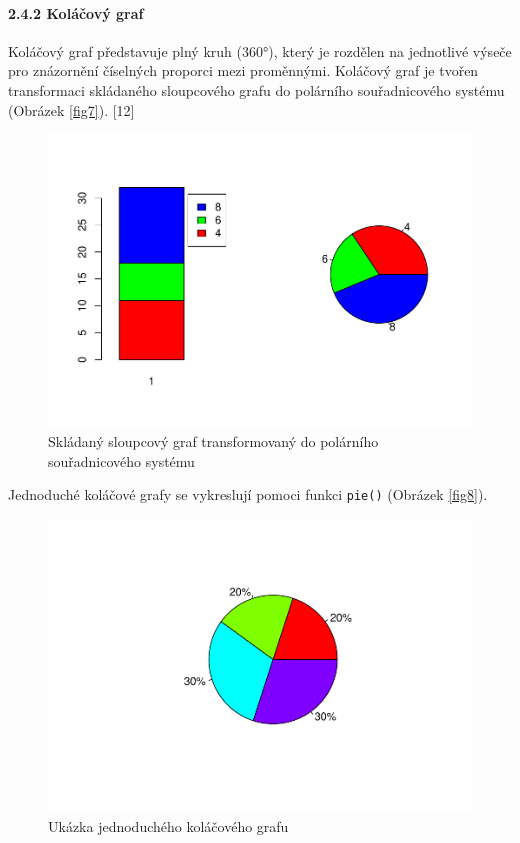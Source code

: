 \documentclass[12pt,]{article}
\let\oldparagraph\paragraph
\renewcommand{\paragraph}[1]{\oldparagraph{#1}\mbox{}}
\begin{document}
\paragraph{2.4.2 Koláčový graf}\label{kolacovy-graf}

\qquad Koláčový graf představuje plný kruh (360°), který je rozdělen na
jednotlivé výseče pro znázornění číselných proporci mezi proměnnými.
Koláčový graf je tvořen transformaci skládaného sloupcového grafu do
polárního souřadnicového systému (Obrázek \ref{fig7}). {[}12{]}

\begin{figure}[H]

{\centering \includegraphics[width=0.65\linewidth]{BP_files/figure-latex/barplot_to_pie-1} 

}

\caption{\label{fig7} Skládaný sloupcový graf transformovaný do polárního souřadnicového systému}\label{fig:barplot_to_pie}
\end{figure}

\qquad Jednoduché koláčové grafy se vykreslují pomoci funkci
\texttt{pie()} (Obrázek \ref{fig8}).

\begin{figure}[H]

{\centering \includegraphics[width=0.65\linewidth]{BP_files/figure-latex/pie_example-1} 

}

\caption{\label{fig8} Ukázka jednoduchého koláčového grafu}\label{fig:pie_example}
\end{figure}
\end{document}
